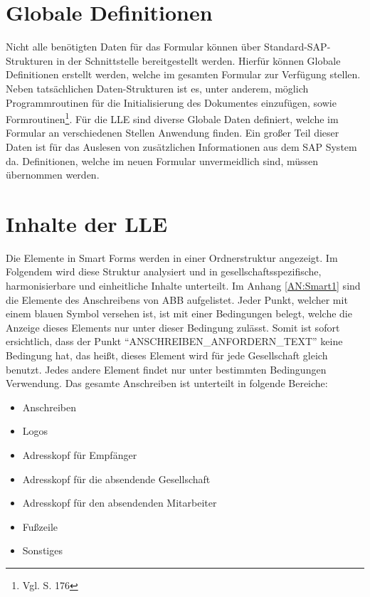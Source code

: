 	\section{Globale Definitionen}
	
	Nicht alle benötigten Daten für das Formular können über Standard-SAP-Strukturen in der Schnittstelle bereitgestellt werden. Hierfür können Globale Definitionen erstellt werden, welche im gesamten Formular zur Verfügung stellen. Neben tatsächlichen Daten-Strukturen ist es, unter anderem, möglich Programmroutinen für die Initialisierung des Dokumentes einzufügen, sowie Formroutinen\footnote{Vgl. \cite{Hertleif.2003} S. 176}. Für die \ac{LLE} sind diverse Globale Daten definiert, welche im Formular an verschiedenen Stellen Anwendung finden. Ein großer Teil dieser Daten ist für das Auslesen von zusätzlichen Informationen aus dem SAP System da. Definitionen, welche im neuen Formular unvermeidlich sind, müssen übernommen werden.
	
	
	\section{Inhalte der \acs{LLE}}
	
	Die Elemente in Smart Forms werden in einer Ordnerstruktur angezeigt. Im Folgendem wird diese Struktur analysiert und in gesellschaftsspezifische, harmonisierbare und einheitliche Inhalte unterteilt.
	Im Anhang \ref{AN:Smart1} sind die Elemente des Anschreibens von ABB aufgelistet. Jeder Punkt, welcher mit einem blauen Symbol versehen ist, ist mit einer Bedingungen belegt, welche die Anzeige dieses Elements nur unter dieser Bedingung zulässt. Somit ist sofort ersichtlich, dass der Punkt "`ANSCHREIBEN\_ANFORDERN\_TEXT"' keine Bedingung hat, das heißt, dieses Element wird für jede Gesellschaft gleich benutzt. Jedes andere Element findet nur unter bestimmten Bedingungen Verwendung. Das gesamte Anschreiben ist unterteilt in folgende Bereiche:
	
	\begin{itemize}
		\item Anschreiben
		\item Logos
		\item Adresskopf für Empfänger
		\item Adresskopf für die absendende Gesellschaft
		\item Adresskopf für den absendenden Mitarbeiter
		\item Fußzeile
		\item Sonstiges
	\end{itemize}

